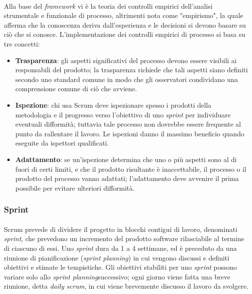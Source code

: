 \paragraph{}
Alla base del \textit{framework} vi è la teoria dei controlli empirici dell'analisi strumentale e funzionale di processo, altrimenti nota come "empirismo", la quale afferma che la conoscenza deriva dall'esperienza e le decisioni si devono basare su ciò che si conosce. L'implementazione dei controlli empirici di processo si basa su tre concetti:
\begin{itemize}
    \item \textbf{Trasparenza}: gli aspetti significativi del processo devono essere visibili ai responsabili del prodotto; la trasparenza richiede che tali aspetti siano definiti secondo uno standard comune in modo che gli osservatori condividano una comprensione comune di ciò che avviene.
    \item \textbf{Ispezione}: chi usa Scrum deve ispezionare spesso i prodotti della metodologia e il progresso verso l'obiettivo di uno \textit{sprint} per individuare eventuali difformità; tuttavia tale processo non dovrebbe essere frequente al punto da rallentare il lavoro. Le ispezioni danno il massimo beneficio quando eseguite da ispettori qualificati.
    \item \textbf{Adattamento}: se un'ispezione determina che uno o più aspetti sono al di fuori di certi limiti, e che il prodotto risultante è inaccettabile, il processo o il prodotto del processo vanno adattati; l'adattamento deve avvenire il prima possibile per evitare ulteriori difformità.
\end{itemize}

\subsubsection{Sprint}
\paragraph{}
Scrum prevede di dividere il progetto in blocchi contigui di lavoro, denominati \textit{sprint}, che prevedono un incremento del prodotto software rilasciabile al termine di ciascuno di essi.
Uno \textit{sprint} dura da 1 a 4 settimane, ed è preceduto da una riunione di pianificazione (\textit{sprint planning}) in cui vengono discussi e definiti obiettivi e stimate le tempistiche. Gli obiettivi stabiliti per uno \textit{sprint} possono variare solo allo \textit{sprint planning}successivo; ogni giorno viene fatta una breve riunione, detta \textit{daily scrum}, in cui viene brevemente discusso il lavoro da svolgere.

